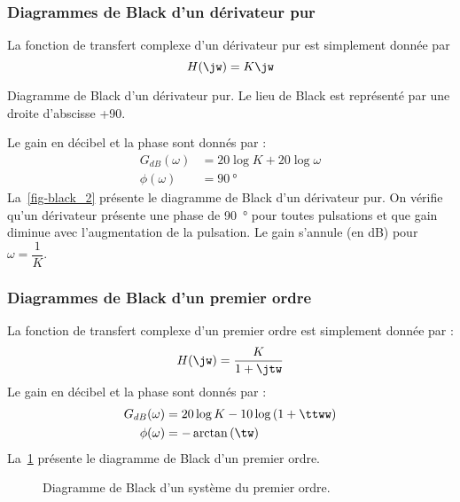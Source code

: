 \subsubsection{Diagrammes de Black d'un dérivateur pur}
La fonction de transfert complexe d'un dérivateur pur est simplement donnée par
\[
    H(\jw)=K\jw
\]
\begin{marginfigure}
    \centering
    \resizebox{\linewidth}{!}{}
    \caption{Diagramme de Black d'un dérivateur pur. Le lieu de Black
             est représenté par une droite d'abscisse +90\degreeSI.
             \label{fig-black_2}}
\end{marginfigure}
Le gain en décibel et la phase sont donnés par :
\begin{align*}
    G_{dB}(\omega)&=20\log{K}+20\log{\omega} \\
      \phi(\omega)&=\SI{90}{\degree}
\end{align*}
La~\cref{fig-black_2} présente le diagramme de Black d'un dérivateur pur. On 
vérifie qu'un dérivateur présente une phase de \SI{+90}{\degree} pour toutes
pulsations et que gain diminue avec l'augmentation de la pulsation. Le gain 
s'annule (en \si{\dB}) pour $\omega=\dfrac{1}{K}$.
\newpage
\restoregeometry
\captionsetup{width=0.9\linewidth}
\subsubsection{Diagrammes de Black d'un premier ordre}
La fonction de transfert complexe d'un premier ordre est simplement donnée par :
\[
    H(\jw)=\dfrac{K}{1+\jtw}
\]
Le gain en décibel et la phase sont donnés par :
\begin{align*}
    G_{dB}(\omega)&=20\log{K}-10\log{\left(1+\ttww\right)} \\
      \phi(\omega)&=-\arctan{(\tw)}
\end{align*}
La~\cref{fig-black_3} présente le diagramme de Black d'un premier ordre.
\begin{figure}[!h]
    \centering
    
    \caption{Diagramme de Black d'un système du premier ordre. 
    \label{fig-black_3}}
\end{figure}
